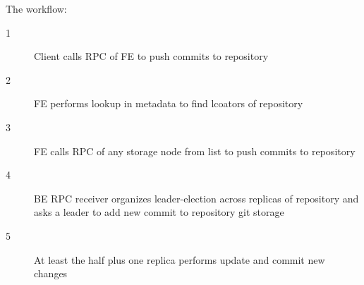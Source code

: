 The workflow:
\begin{description}
  \item[1] Client calls RPC of FE to push commits  to repository 
  \item[2] FE performs lookup in metadata to find lcoators  of repository 
  \item[3] FE calls RPC of any storage node from  list to push commits  to
    repository 
  \item[4] BE RPC receiver organizes leader-election across replicas of repository 
    and asks a leader to add new commit  to repository git storage
  \item[5] At least the half plus one replica performs update and commit new changes
\end{description}

